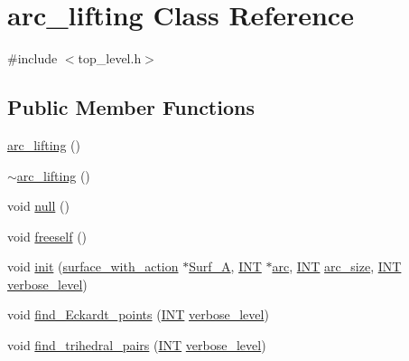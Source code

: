 \hypertarget{classarc__lifting}{}\section{arc\+\_\+lifting Class Reference}
\label{classarc__lifting}


{\ttfamily \#include $<$top\+\_\+level.\+h$>$}

\subsection*{Public Member Functions}
\begin{DoxyCompactItemize}
\item 
\mbox{\hyperlink{classarc__lifting_a703118466cadb012d98929cc423615c1}{arc\+\_\+lifting}} ()
\item 
\mbox{\hyperlink{classarc__lifting_a832403222692d0eb573e9b5b661ab5fc}{$\sim$arc\+\_\+lifting}} ()
\item 
void \mbox{\hyperlink{classarc__lifting_afa544548c783fc9ac5e952dc1a2425da}{null}} ()
\item 
void \mbox{\hyperlink{classarc__lifting_a9a3598d6e4f101d1645eac48838fbea9}{freeself}} ()
\item 
void \mbox{\hyperlink{classarc__lifting_a11fc382addd05e0bbe8b0b44dcd4c55e}{init}} (\mbox{\hyperlink{classsurface__with__action}{surface\+\_\+with\+\_\+action}} $\ast$\mbox{\hyperlink{classarc__lifting_a40cc904d89201e5ddf4ae210f973ae85}{Surf\+\_\+A}}, \mbox{\hyperlink{galois_8h_a09fddde158a3a20bd2dcadb609de11dc}{I\+NT}} $\ast$\mbox{\hyperlink{classarc__lifting_a057e6c4873d8090f42ff29c9a8283820}{arc}}, \mbox{\hyperlink{galois_8h_a09fddde158a3a20bd2dcadb609de11dc}{I\+NT}} \mbox{\hyperlink{classarc__lifting_a22856d8038ab145b6e6541c0f311eacc}{arc\+\_\+size}}, \mbox{\hyperlink{galois_8h_a09fddde158a3a20bd2dcadb609de11dc}{I\+NT}} \mbox{\hyperlink{simeon_8_c_a818073fbcc2f439e7c56952f67386122}{verbose\+\_\+level}})
\item 
void \mbox{\hyperlink{classarc__lifting_a70012c92bd78768f5c1c5d14f995147b}{find\+\_\+\+Eckardt\+\_\+points}} (\mbox{\hyperlink{galois_8h_a09fddde158a3a20bd2dcadb609de11dc}{I\+NT}} \mbox{\hyperlink{simeon_8_c_a818073fbcc2f439e7c56952f67386122}{verbose\+\_\+level}})
\item 
void \mbox{\hyperlink{classarc__lifting_a04b276087c97becd9a4e208ea7ec45fe}{find\+\_\+trihedral\+\_\+pairs}} (\mbox{\hyperlink{galois_8h_a09fddde158a3a20bd2dcadb609de11dc}{I\+NT}} \mbox{\hyperlink{simeon_8_c_a818073fbcc2f439e7c56952f67386122}{verbose\+\_\+level}})

\end{DoxyCompactItemize}
